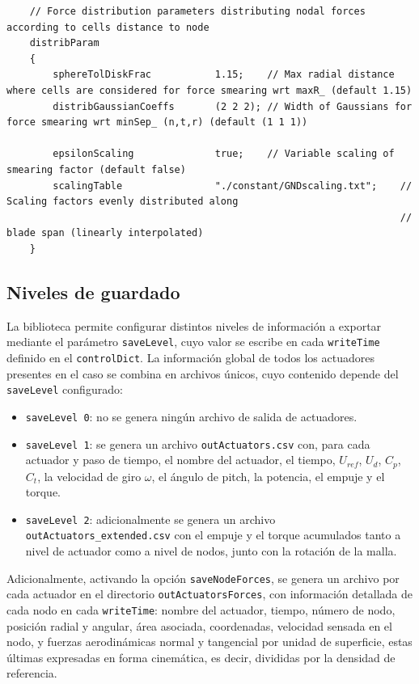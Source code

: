 \begin{scriptsize}
\begin{verbatim}
    // Force distribution parameters distributing nodal forces according to cells distance to node
    distribParam
    {
        sphereTolDiskFrac           1.15;    // Max radial distance where cells are considered for force smearing wrt maxR_ (default 1.15)
        distribGaussianCoeffs       (2 2 2); // Width of Gaussians for force smearing wrt minSep_ (n,t,r) (default (1 1 1))
    
        epsilonScaling              true;    // Variable scaling of smearing factor (default false)
        scalingTable                "./constant/GNDscaling.txt";    // Scaling factors evenly distributed along 
                                                                    // blade span (linearly interpolated)
    }
\end{verbatim}
\end{scriptsize}

\subsection{Niveles de guardado}
La biblioteca permite configurar distintos niveles de información a exportar mediante el parámetro \texttt{saveLevel}, cuyo valor se escribe en cada \texttt{writeTime} definido en el \texttt{controlDict}. La información global de todos los actuadores presentes en el caso se combina en archivos únicos, cuyo contenido depende del \texttt{saveLevel} configurado:
\begin{itemize}
\item \texttt{saveLevel 0}: no se genera ningún archivo de salida de actuadores.
\item \texttt{saveLevel 1}: se genera un archivo \texttt{outActuators.csv} con, para cada actuador y paso de tiempo, el nombre del actuador, el tiempo, $U_{ref}$, $U_d$, $C_p$, $C_t$, la velocidad de giro $\omega$, el ángulo de pitch, la potencia, el empuje y el torque.
\item \texttt{saveLevel 2}: adicionalmente se genera un archivo \texttt{outActuators\_extended.csv} con el empuje y el torque acumulados tanto a nivel de actuador como a nivel de nodos, junto con la rotación de la malla.
\end{itemize}
Adicionalmente, activando la opción \texttt{saveNodeForces}, se genera un archivo por cada actuador en el directorio \texttt{outActuatorsForces}, con información detallada de cada nodo en cada \texttt{writeTime}: nombre del actuador, tiempo, número de nodo, posición radial y angular, área asociada, coordenadas, velocidad sensada en el nodo, y fuerzas aerodinámicas normal y tangencial por unidad de superficie, estas últimas expresadas en forma cinemática, es decir, divididas por la densidad de referencia.

